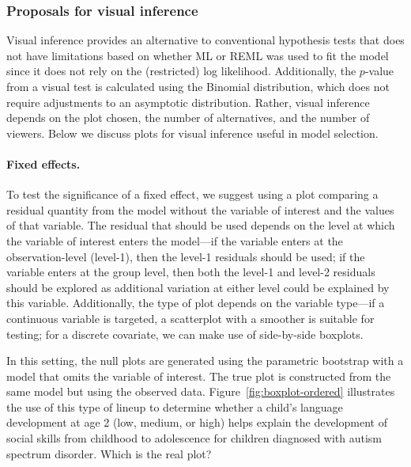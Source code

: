 \documentclass{article} %
\newcommand{\hh}[1]{{\color{orange} #1}}
\begin{document}
\subsubsection{Proposals for visual inference}\label{model-selection}

Visual inference provides an alternative to conventional hypothesis tests that does not have limitations based on whether ML or REML was used to fit the model since it does not rely on the (restricted) log likelihood. Additionally, the $p$-value from a visual test is calculated using the Binomial distribution, which does not require adjustments to an asymptotic distribution. Rather, visual inference depends on the plot chosen, the number of alternatives, and the number of viewers. Below we discuss plots for visual inference useful in model selection.

\paragraph{Fixed effects.} To test the significance of a fixed effect, we suggest using a plot comparing a residual quantity from the model without the variable of interest and the values of that variable. The residual that should be used depends on the level at which the variable of interest enters the model---if the variable enters at the observation-level (level-1), then the level-1 residuals should be used; if the variable enters at the group level, then both the level-1 and level-2 residuals should be explored as additional variation at either level could be explained by this variable. Additionally, the type of plot depends on the variable type---if a continuous variable is targeted,  a scatterplot with a smoother \hh{is suitable for testing}; for a discrete covariate, \hh{we can make use of} side-by-side boxplots. 



In this setting, the null plots are generated using the parametric bootstrap with a model that omits the variable of interest. The true plot is constructed from the same model but using the observed data. Figure~\ref{fig:boxplot-ordered} illustrates the use of this type of lineup to determine whether a child's language development at age 2 (low, medium, or high) helps explain the development of social skills from childhood to adolescence for children diagnosed with autism spectrum disorder. Which is the real plot? 
\end{document}
